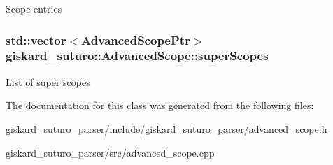 Scope entries \hypertarget{classgiskard__suturo_1_1AdvancedScope_ab4a2ea0c6a7d6401c7e5b2795a3094bb}{
\subsubsection[{super\-Scopes}]{\setlength{\rightskip}{0pt plus 5cm}std\-::vector$<$Advanced\-Scope\-Ptr$>$ giskard\-\_\-suturo\-::\-Advanced\-Scope\-::super\-Scopes\hspace{0.3cm}{\ttfamily [private]}}}\label{classgiskard__suturo_1_1AdvancedScope_ab4a2ea0c6a7d6401c7e5b2795a3094bb}
List of super scopes 

The documentation for this class was generated from the following files\-:\begin{DoxyCompactItemize}
\item 
giskard\-\_\-suturo\-\_\-parser/include/giskard\-\_\-suturo\-\_\-parser/advanced\-\_\-scope.\-h\item 
giskard\-\_\-suturo\-\_\-parser/src/advanced\-\_\-scope.\-cpp\end{DoxyCompactItemize}
